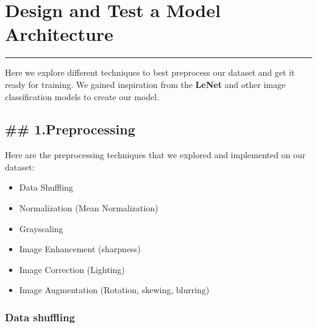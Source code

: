 \documentclass[11pt]{article}
\providecommand{\tightlist}{%
      \setlength{\itemsep}{0pt}\setlength{\parskip}{0pt}}
\begin{document}
    \hypertarget{design-and-test-a-model-architecture}{%
\section{Design and Test a Model
Architecture}\label{design-and-test-a-model-architecture}}

\begin{center}\rule{0.5\linewidth}{\linethickness}\end{center}

Here we explore different techniques to best preprocess our dataset and
get it ready for training. We gained inspiration from the \textbf{LeNet}
and other image classification models to create our model.

    \hypertarget{preprocessing}{%
\subsection{\#\# 1.Preprocessing}\label{preprocessing}}

Here are the preprocessing techniques that we explored and implemented
on our dataset:

\begin{itemize}
\tightlist
\item
  Data Shuffling
\item
  Normalization (Mean Normalization)
\item
  Grayscaling
\item
  Image Enhancement (sharpness)
\item
  Image Correction (Lighting)
\item
  Image Augmentation (Rotation, skewing, blurring)
\end{itemize}

    \hypertarget{data-shuffling}{%
\subsubsection{Data shuffling}\label{data-shuffling}}
\end{document}

